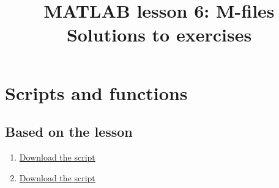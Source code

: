 \documentclass{article}
\title{MATLAB lesson 6: M-files\\Solutions to exercises}
\date{}
\author{} %
\begin{document}
	\maketitle
	
	\section{Scripts and functions}
	\subsection*{Based on the lesson}
		\begin{enumerate}
			\item \href{https://github.com/UoMResearchIT/MATLAB-online-exercises/raw/master/lesson6_mfiles/q1.m}{Download the script}
			
			\item \href{https://github.com/UoMResearchIT/MATLAB-online-exercises/raw/master/lesson6_mfiles/q2.m}{Download the script}

		\end{enumerate}
\end{document}
